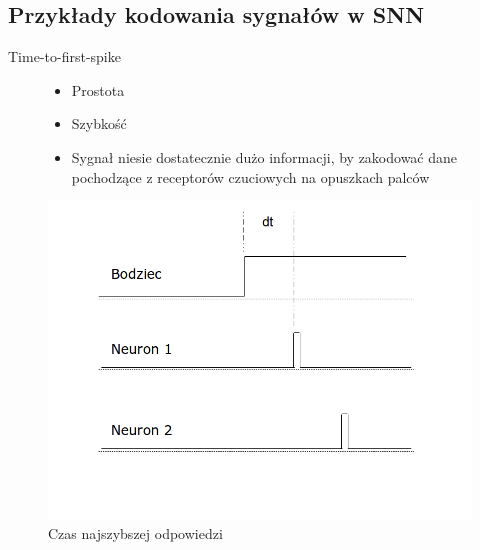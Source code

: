 \documentclass{beamer}
\begin{document}
\subsection{Przykłady kodowania sygnałów w SNN}
\begin{frame}{Time-to-first-spike}
	\begin{figure}[ht]
		\begin{minipage}{0.48\linewidth}
			\begin{itemize}
				\item Prostota
				\item Szybkość
				\item Sygnał niesie dostatecznie dużo informacji, by zakodować dane pochodzące z receptorów czuciowych na opuszkach palców
			\end{itemize}
		\end{minipage}
		\hfill
		\begin{minipage}{0.48\linewidth}
		\centering
		\includegraphics[width=\textwidth]{TimeToFirstSpike.png}
		\caption{Czas najszybszej odpowiedzi}
		\end{minipage}
	\end{figure}
\end{frame}
\end{document}

